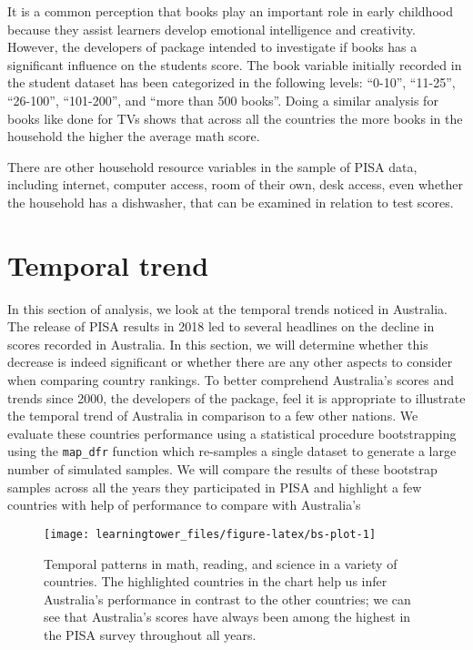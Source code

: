 It is a common perception that books play an important role in early childhood because they assist learners develop emotional intelligence and creativity. However, the developers of  package intended to investigate if books has a significant influence on the students score. The book variable initially recorded in the student dataset has been categorized in the following levels: ``0-10'', ``11-25'', ``26-100'', ``101-200'', and ``more than 500 books''. Doing a similar analysis for books like done for TVs shows that across all the countries the more books in the household the higher the average math score.

There are other household resource variables in the sample of PISA data, including internet, computer access, room of their own, desk access, even whether the household has a dishwasher, that can be examined in relation to test scores.

\section{Temporal trend}\label{temporal-trend}

In this section of analysis, we look at the temporal trends noticed in Australia. The release of PISA results in 2018 led to several headlines on the decline in scores recorded in Australia. In this section, we will determine whether this decrease is indeed significant or whether there are any other aspects to consider when comparing country rankings. To better comprehend Australia's scores and trends since 2000, the developers of the  package, feel it is appropriate to illustrate the temporal trend of Australia in comparison to a few other nations. We evaluate these countries performance using a statistical procedure bootstrapping using the \texttt{map\_dfr} function which re-samples a single dataset to generate a large number of simulated samples. We will compare the results of these bootstrap samples across all the years they participated in PISA and highlight a few countries with help of  \citep{gghighlight} performance to compare with Australia's

\begin{figure}[H]
\texttt{[image: learningtower\_files/figure-latex/bs-plot-1]} \caption{Temporal patterns in math, reading, and science in a variety of countries. The highlighted countries in the chart help us infer Australia's performance in contrast to the other countries; we can see that Australia's scores have always been among the highest in the PISA survey throughout all years.}\label{fig:bs-plot}
\end{figure}

